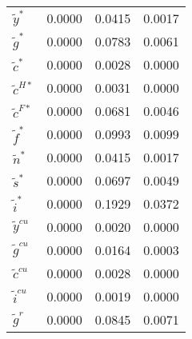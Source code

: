 \begin{center}
\begin{longtable}{lccc}
${\tilde y^*}          $	 & 	       0.0000	 & 	       0.0415	 & 	       0.0017 \\ 
${\tilde g^*}          $	 & 	       0.0000	 & 	       0.0783	 & 	       0.0061 \\ 
${\tilde c^*}          $	 & 	       0.0000	 & 	       0.0028	 & 	       0.0000 \\ 
${\tilde c^{H*}}       $	 & 	       0.0000	 & 	       0.0031	 & 	       0.0000 \\ 
${\tilde c^{F*}}       $	 & 	       0.0000	 & 	       0.0681	 & 	       0.0046 \\ 
${\tilde f^*}          $	 & 	       0.0000	 & 	       0.0993	 & 	       0.0099 \\ 
${\tilde n^*}          $	 & 	       0.0000	 & 	       0.0415	 & 	       0.0017 \\ 
${\tilde s^*}          $	 & 	       0.0000	 & 	       0.0697	 & 	       0.0049 \\ 
${\tilde i^*}          $	 & 	       0.0000	 & 	       0.1929	 & 	       0.0372 \\ 
${\tilde y^{cu}}       $	 & 	       0.0000	 & 	       0.0020	 & 	       0.0000 \\ 
${\tilde g^{cu}}       $	 & 	       0.0000	 & 	       0.0164	 & 	       0.0003 \\ 
${\tilde c^{cu}}       $	 & 	       0.0000	 & 	       0.0028	 & 	       0.0000 \\ 
${\tilde i^{cu}}       $	 & 	       0.0000	 & 	       0.0019	 & 	       0.0000 \\ 
${\tilde g^{r}}        $	 & 	       0.0000	 & 	       0.0845	 & 	       0.0071 \\ 
\end{longtable}
 \end{center}
